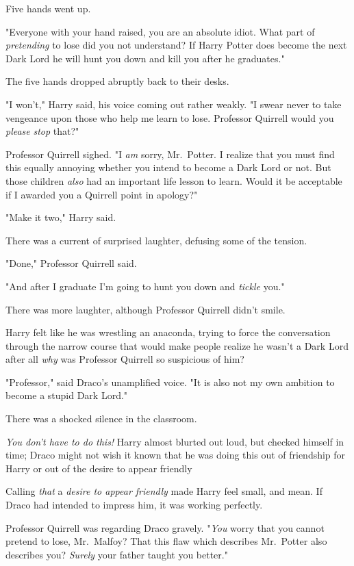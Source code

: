 Five hands went up.

"Everyone with your hand raised, you are an absolute idiot. What part of
\emph{pretending} to lose did you not understand? If Harry Potter does become
the next Dark Lord he will hunt you down and kill you after he graduates."

The five hands dropped abruptly back to their desks.

"I won't," Harry said, his voice coming out rather weakly. "I swear never to
take vengeance upon those who help me learn to lose. Professor Quirrell{\el}
would you \emph{please}{\el} \emph{stop} that?"

Professor Quirrell sighed. "I \emph{am} sorry, Mr.~Potter. I realize that you
must find this equally annoying whether you intend to become a Dark Lord or
not. But those children \emph{also} had an important life lesson to learn.
Would it be acceptable if I awarded you a Quirrell point in apology?"

"Make it two," Harry said.

There was a current of surprised laughter, defusing some of the tension.

"Done," Professor Quirrell said.

"And after I graduate I'm going to hunt you down and \emph{tickle} you."

There was more laughter, although Professor Quirrell didn't smile.

Harry felt like he was wrestling an anaconda, trying to force the conversation
through the narrow course that would make people realize he wasn't a Dark Lord
after all{\el} \emph{why} was Professor Quirrell so suspicious of him?

"Professor," said Draco's unamplified voice. "It is also not my own ambition to
become a stupid Dark Lord."

There was a shocked silence in the classroom.

\emph{You don't have to do this!} Harry almost blurted out loud, but checked
himself in time; Draco might not wish it known that he was doing this out of
friendship for Harry{\el} or out of the desire to appear friendly{\el}

Calling \emph{that} a \emph{desire to appear friendly} made Harry feel small,
and mean. If Draco had intended to impress him, it was working perfectly.

Professor Quirrell was regarding Draco gravely. "\emph{You} worry that you
cannot pretend to lose, Mr.~Malfoy? That this flaw which describes Mr.~Potter
also describes you? \emph{Surely} your father taught you better."

